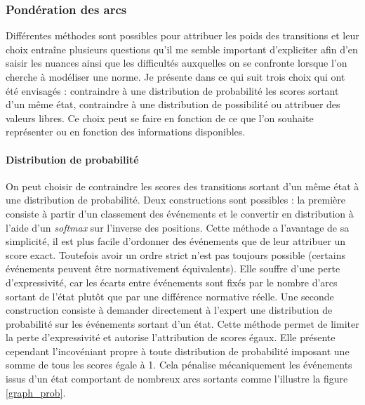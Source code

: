  \subsubsection{Pondération des arcs} \label{jugeexpert}

 Différentes méthodes sont possibles pour attribuer les poids des transitions et leur choix entraîne plusieurs questions qu'il me semble important d'expliciter afin d'en saisir les nuances ainsi que les difficultés auxquelles on se confronte lorsque l'on cherche à modéliser une norme. Je présente dans ce qui suit trois choix qui ont été envisagés : contraindre à une distribution de probabilité les scores sortant d'un même état, contraindre à une distribution de possibilité ou attribuer des valeurs libres. Ce choix peut se faire en fonction de ce que l'on souhaite représenter ou en fonction des informations disponibles.

 \paragraph{Distribution de probabilité}

 On peut choisir de contraindre les scores des transitions sortant d'un même état à une distribution de probabilité. Deux constructions sont possibles : la première consiste à partir d'un classement des événements et le convertir en distribution à l'aide d'un \textit{softmax} sur l'inverse des positions. Cette méthode a l'avantage de sa simplicité, il est plus facile d'ordonner des événements que de leur attribuer un score exact. Toutefois avoir un ordre strict n'est pas toujours possible (certains événements peuvent être normativement équivalents). Elle souffre d'une perte d'expressivité, car les écarts entre événements sont fixés par le nombre d'arcs sortant de l'état plutôt que par une différence normative réelle.
 Une seconde construction consiste à demander directement à l'expert une distribution de probabilité sur les événements sortant d'un état. Cette méthode permet de limiter la perte d'expressivité et autorise l'attribution de scores égaux. Elle présente cependant l'incovéniant propre à toute distribution de probabilité imposant une somme de tous les scores égale à 1. Cela pénalise mécaniquement les événements issus d'un état comportant de nombreux arcs sortants comme l'illustre la figure \ref{graph_prob}.


